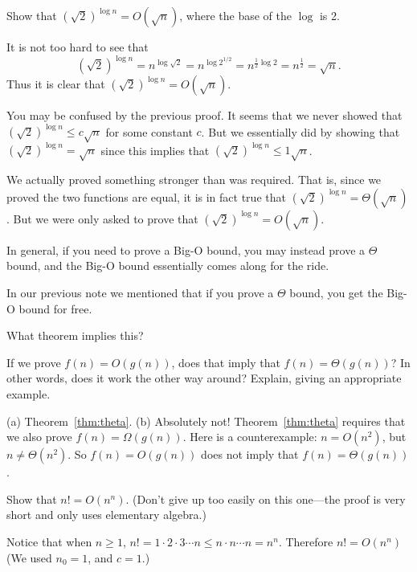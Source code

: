 \begin{exa}
Show that $(\sqrt{2})^{\log n}=O(\sqrt{n})$, where the base of the $\log$ is 2.
\begin{pf}
It is not too hard to see that 
$$(\sqrt{2})^{\log n}=n^{\log \sqrt{2}}=n^{\log 2^{1/2}}=
n^{\frac{1}{2}\log 2}=n^{\frac{1}{2}}=\sqrt{n}.$$
Thus it is clear that $(\sqrt{2})^{\log n}=O(\sqrt{n})$.
\end{pf}
\end{exa}

\begin{rem}
You may be confused by the previous proof.  It seems that we never showed that 
$(\sqrt{2})^{\log n}\leq c\sqrt{n}$ for some constant $c$.  
But we essentially did by showing that $(\sqrt{2})^{\log n}=\sqrt{n}$ since
this implies that 
$(\sqrt{2})^{\log n}\leq 1\sqrt{n}$. 
 
We actually proved something stronger than was required.
That is, since we proved the two functions are equal, it is in fact true that 
$(\sqrt{2})^{\log n}=\Theta(\sqrt{n})$.  But we were only asked to prove 
that $(\sqrt{2})^{\log n}=O(\sqrt{n})$.

In general, if you need to prove a Big-O bound, you may instead prove a $\Theta$ 
bound, and the Big-O bound essentially comes along for the ride.
\end{rem}

\begin{ques}
In our previous note we mentioned that if you prove a $\Theta$ bound, 
you get the Big-O bound for free.  
\begin{lenum}
\item
What theorem implies this?

\noindent
\answerline
\item
If we prove $f(n)=O(g(n))$, does that imply that $f(n)=\Theta(g(n))$?
In other words, does it work the other way around? Explain, giving an appropriate example.

\noindent
\answerlinetwo
\end{lenum}
\begin{answer}
(a) Theorem~\ref{thm:theta}.
(b) Absolutely not!  Theorem~\ref{thm:theta} requires that we also prove 
$f(n)=\Omega(g(n))$.  Here is a counterexample: $n=O(n^2)$, but $n\neq\Theta(n^2)$. 
So $f(n)=O(g(n))$ does not imply that $f(n)=\Theta(g(n))$.
\end{answer}
\end{ques}

\begin{exer}
Show that $n!=O(n^n)$. 
(Don't give up too easily on this one---the proof is very short and only uses
elementary algebra.)

\vspace*{2.25in}
\begin{answer}
Notice that when $n\geq 1$, 
$n!=1\cdot 2\cdot 3\cdots n \leq n\cdot n\cdots n = n^n.$
Therefore $n!=O(n^n)$ (We used $n_0=1$, and $c=1$.)
\end{answer}
\end{exer}


